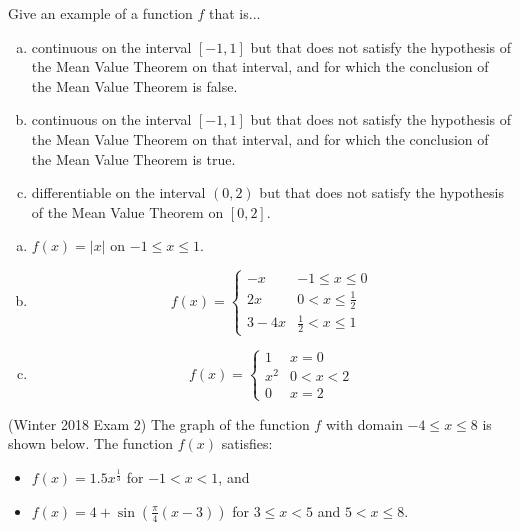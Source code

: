 \documentclass[11pt]{exam}
\begin{document}
\begin{questions}
  \question Give an example of a function $f$ that is...
\begin{enumerate}[(a)]
	\item continuous on the interval $[-1,1]$ but that does not satisfy the hypothesis of the Mean Value Theorem on that interval, and for which the conclusion of the Mean Value Theorem is false.
	\item continuous on the interval $[-1,1]$ but that does not satisfy the hypothesis of the Mean Value Theorem on that interval, and for which the conclusion of the Mean Value Theorem is true.
	\item differentiable on the interval $(0,2)$ but that does not satisfy the hypothesis of the Mean Value Theorem on $[0,2]$.
\end{enumerate}
\begin{solution}
  \begin{enumerate}[(a)]
  \item \(f(x) = |x|\) on \(-1 \leq x \leq 1\).
  \item \[
      f(x) =
      \begin{cases}
        -x & -1 \leq x \leq 0\\
        2x & 0 < x \leq \frac{1}{2}\\
        3-4x & \frac{1}{2} < x \leq 1
      \end{cases}
    \]
  \item \[
      f(x) =
      \begin{cases}
        1 & x=0\\
        x^2 & 0 < x < 2\\
        0 & x=2
      \end{cases}
    \]
  \end{enumerate}
\end{solution}
\question (Winter 2018 Exam 2) The graph of the function $f$ with domain $-4 \leqslant x \leqslant 8$ is shown below. The function $f(x)$ satisfies:
\begin{itemize}
\item $f(x) = 1.5 x^{\frac{1}{3}}$ for $-1<x<1$, and
\item $f(x) = 4 +\displaystyle\sin \left( \frac{\pi}{4} (x-3) \right)$ for $3 \leqslant x < 5$ and $5 < x \leqslant 8$.
\end{itemize}
\vspace{-0.5em}
\begin{center}

\end{center}
\end{questions}
\end{document}
